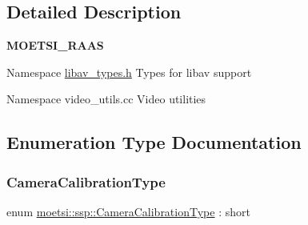 \subsection{Detailed Description}
{\bfseries M\+O\+E\+T\+S\+I\+\_\+\+R\+A\+AS} 

Namespace \hyperlink{libav__types_8h_source}{libav\+\_\+types.\+h} Types for libav support

Namespace video\+\_\+utils.\+cc Video utilities 

\subsection{Enumeration Type Documentation}
\mbox{\label{namespacemoetsi_1_1ssp_a1f51291db51233dc5865d42e6ee36ef8}} 
\subsubsection{\texorpdfstring{Camera\+Calibration\+Type}{CameraCalibrationType}\hspace{0.1cm}{\footnotesize\ttfamily [1/2]}}
{\footnotesize\ttfamily enum \hyperlink{namespacemoetsi_1_1ssp_a1f51291db51233dc5865d42e6ee36ef8}{moetsi\+::ssp\+::\+Camera\+Calibration\+Type} \+: short\hspace{0.3cm}{\ttfamily [strong]}}

